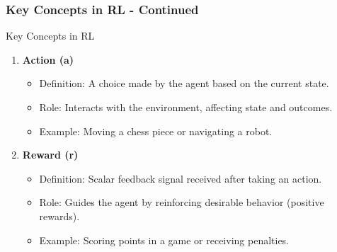 \documentclass[aspectratio=169]{beamer}
\begin{document}
\begin{frame}[fragile]
    \frametitle{Key Concepts in RL - Continued}
    \begin{block}{Key Concepts in RL}
        \begin{enumerate}[resume]
            \item \textbf{Action (a)}
                \begin{itemize}
                    \item Definition: A choice made by the agent based on the current state.
                    \item Role: Interacts with the environment, affecting state and outcomes.
                    \item Example: Moving a chess piece or navigating a robot.
                \end{itemize}
                
            \item \textbf{Reward (r)}
                \begin{itemize}
                    \item Definition: Scalar feedback signal received after taking an action.
                    \item Role: Guides the agent by reinforcing desirable behavior (positive rewards).
                    \item Example: Scoring points in a game or receiving penalties.
                \end{itemize}
        \end{enumerate}
    \end{block}
\end{frame}
\end{document}
